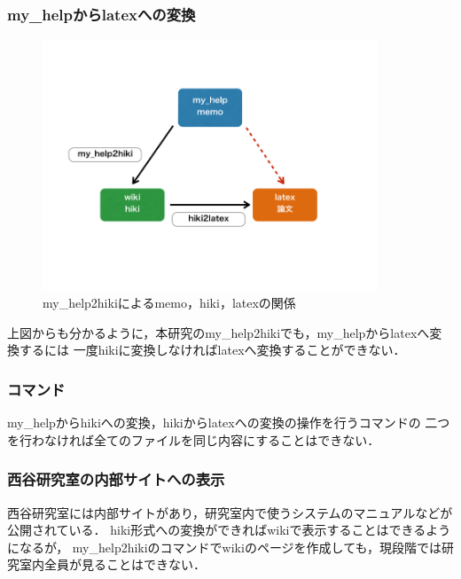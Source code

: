 \subsubsection{my\_helpからlatexへの変換}
\begin{figure}[htbp]\begin{center}
\includegraphics[width=10cm,bb= 0 0 737 453]{../figs/./my_help2hiki_saki.007.png}
\caption{my\_help2hikiによるmemo，hiki，latexの関係}
\label{default}\end{center}\end{figure}
上図からも分かるように，本研究のmy\_help2hikiでも，my\_helpからlatexへ変換するには
一度hikiに変換しなければlatexへ変換することができない．

\subsubsection{コマンド}
my\_helpからhikiへの変換，hikiからlatexへの変換の操作を行うコマンドの
二つを行わなければ全てのファイルを同じ内容にすることはできない．

\subsubsection{西谷研究室の内部サイトへの表示}
西谷研究室には内部サイトがあり，研究室内で使うシステムのマニュアルなどが公開されている．
hiki形式への変換ができればwikiで表示することはできるようになるが，
my\_help2hikiのコマンドでwikiのページを作成しても，現段階では研究室内全員が見ることはできない．

